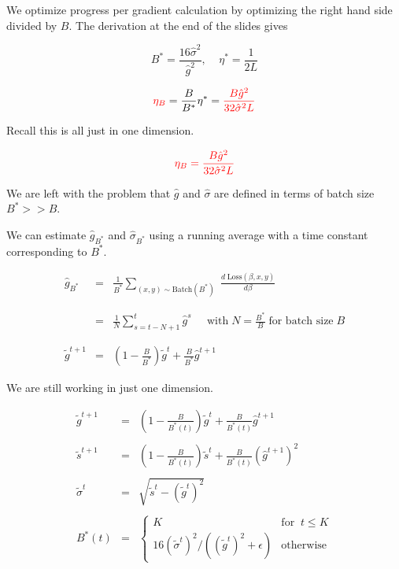 {{\vfill
We optimize progress per gradient calculation by optimizing the right hand side divided by $B$.  The derivation at the end of the slides gives

\vfill
$$B^*  =  \frac{16\hat{\sigma}^2}{\hat{g}^2},\;\;\;\;\eta^*  =  \frac{1}{2L}$$

\vfill
$${\color{red} \eta_B} = \frac{B}{B^*} \eta^* = {\color{red} \frac{B \hat{g}^2}{32\hat{\sigma}^2L}}$$

\vfill
Recall this is all just in one dimension.


$${\color{red} \eta_B = \frac{B \hat{g}^2}{32\hat{\sigma}^2L}}$$

\vfill
We are left with the problem that $\hat{g}$ and $\hat{\sigma}$ are defined in terms of batch size $B^* >> B$.

\vfill
We can estimate $\hat{g}_{B^*}$ and $\hat{\sigma}_{B^*}$ using a running average with a time constant corresponding to $B^*$.


\begin{eqnarray*}
  \hat{g}_{B^*} & = & \frac{1}{B^*} \sum_{(x,y) \sim \mathrm{Batch}(B^*)}\; \frac{d\;\mathrm{Loss}(\beta,x,y)}{d\beta} \\
  \\
  \\
  & = & \frac{1}{N} \sum_{s=t-N+1}^t \hat{g}^s\;\;\;\;\;\mbox{with}\;N= \frac{B^*}{B} \;\mbox{for batch size}\;B \\
  \\
  \\
  \tilde{g}^{t+1} & = & \left(1-\frac{B}{B^*}\right)\tilde{g}^t + \frac{B}{B^*} \hat{g}^{t+1}
\end{eqnarray*}

\vfill
We are still working in just one dimension.

\begin{eqnarray*}
  \tilde{g}^{t+1} & = & \left(1-\frac{B}{B^*(t)}\right)\tilde{g}^t + \frac{B}{B^*(t)} \hat{g}^{t+1} \\
  \\
  \tilde{s}^{t+1} & = & \left(1-\frac{B}{B^*(t)}\right)\tilde{s}^t + \frac{B}{B^*(t)} (\hat{g}^{t+1})^2 \\
  \\
  \tilde{\sigma}^t & = & \sqrt{\tilde{s}^t - (\tilde{g}^t)^2} \\
  \\
  B^*(t) &= & \left\{\begin{array}{ll} K & \mbox{for}\;\; t \leq K \\
  16(\tilde{\sigma}^t)^2/((\tilde{g}^t)^2 + \epsilon) & \mbox{otherwise} \end{array}\right.
\end{eqnarray*}

}}
